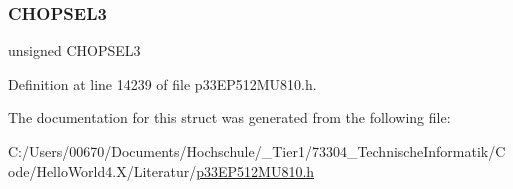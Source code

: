 \subsubsection{\texorpdfstring{C\+H\+O\+P\+S\+E\+L3}{CHOPSEL3}}
{\footnotesize\ttfamily unsigned C\+H\+O\+P\+S\+E\+L3}



Definition at line 14239 of file p33\+E\+P512\+M\+U810.\+h.



The documentation for this struct was generated from the following file\+:\begin{DoxyCompactItemize}
\item 
C\+:/\+Users/00670/\+Documents/\+Hochschule/\+\_\+\+Tier1/73304\+\_\+\+Technische\+Informatik/\+Code/\+Hello\+World4.\+X/\+Literatur/\hyperlink{p33_e_p512_m_u810_8h}{p33\+E\+P512\+M\+U810.\+h}\end{DoxyCompactItemize}

